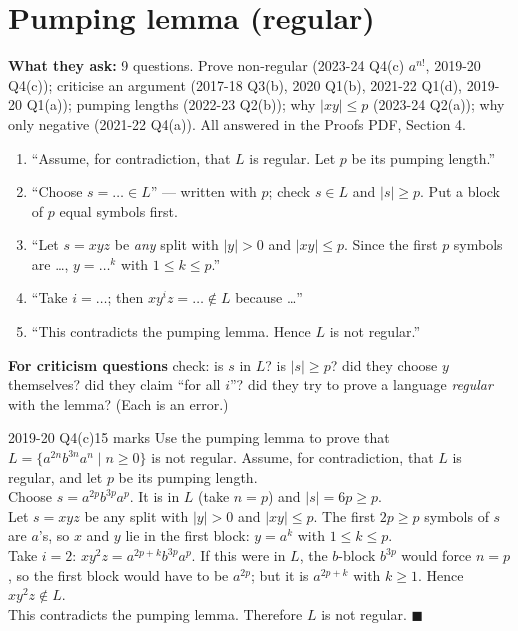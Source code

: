 \documentclass[10.5pt,a4paper]{article}
\newcommand{\asked}[1]{{\small\color{gray!60!black}\textbf{What they ask:} #1}\par}
\begin{document}
\section{Pumping lemma (regular)}
\asked{9 questions. Prove non-regular (2023-24 Q4(c) $a^{n!}$, 2019-20 Q4(c)); criticise an argument (2017-18 Q3(b), 2020 Q1(b),
2021-22 Q1(d), 2019-20 Q1(a)); pumping lengths (2022-23 Q2(b)); why $|xy|\le p$ (2023-24 Q2(a)); why only negative (2021-22 Q4(a)).
All answered in the Proofs PDF, Section 4.}
\begin{recipe}
\begin{enumerate}
\item ``Assume, for contradiction, that $L$ is regular. Let $p$ be its pumping length.''
\item ``Choose $s=\dots\in L$'' --- written with $p$; check $s\in L$ and $|s|\ge p$. Put a block of $p$ equal symbols first.
\item ``Let $s=xyz$ be \emph{any} split with $|y|>0$ and $|xy|\le p$. Since the first $p$ symbols are \dots, $y=\dots^k$ with $1\le k\le p$.''
\item ``Take $i=\dots$; then $xy^iz=\dots\notin L$ because \dots''
\item ``This contradicts the pumping lemma. Hence $L$ is not regular.''
\end{enumerate}
\textbf{For criticism questions} check: is $s$ in $L$? is $|s|\ge p$? did they choose $y$ themselves? did they claim ``for all $i$''? did
they try to prove a language \emph{regular} with the lemma? (Each is an error.)
\end{recipe}

\begin{examq}{2019-20 Q4(c)}{15 marks}
Use the pumping lemma to prove that $L=\{a^{2n}b^{3n}a^n\mid n\ge0\}$ is not regular.
\tcblower
Assume, for contradiction, that $L$ is regular, and let $p$ be its pumping length.\\
Choose $s=a^{2p}b^{3p}a^{p}$. It is in $L$ (take $n=p$) and $|s|=6p\ge p$.\\
Let $s=xyz$ be any split with $|y|>0$ and $|xy|\le p$. The first $2p\ge p$ symbols of $s$ are $a$'s, so $x$ and $y$ lie in the first block:
$y=a^k$ with $1\le k\le p$.\\
Take $i=2$: $xy^2z=a^{2p+k}b^{3p}a^{p}$. If this were in $L$, the $b$-block $b^{3p}$ would force $n=p$, so the first block would have to be
$a^{2p}$; but it is $a^{2p+k}$ with $k\ge1$. Hence $xy^2z\notin L$.\\
This contradicts the pumping lemma. Therefore $L$ is not regular. $\blacksquare$
\end{examq}
\end{document}
